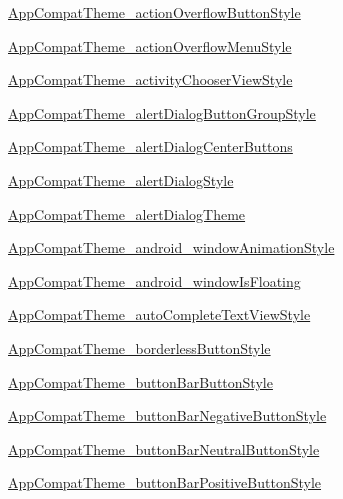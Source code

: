 \begin{Desc}
\hyperlink{classandroid_1_1support_1_1v4_1_1_r_1_1styleable_37abdbb58ba6784cee7b4db7074bb2d4}{AppCompatTheme\_\-actionOverflowButtonStyle} 

\hyperlink{classandroid_1_1support_1_1v4_1_1_r_1_1styleable_a866c80182ecc37a2b36bd4b28132297}{AppCompatTheme\_\-actionOverflowMenuStyle} 

\hyperlink{classandroid_1_1support_1_1v4_1_1_r_1_1styleable_69fd4d038df58587b69f6986d49ed8c1}{AppCompatTheme\_\-activityChooserViewStyle} 

\hyperlink{classandroid_1_1support_1_1v4_1_1_r_1_1styleable_00941c54362f2db3092824ceb3be22dd}{AppCompatTheme\_\-alertDialogButtonGroupStyle} 

\hyperlink{classandroid_1_1support_1_1v4_1_1_r_1_1styleable_8ec720cdfc46d6cc33d23d0459197671}{AppCompatTheme\_\-alertDialogCenterButtons} 

\hyperlink{classandroid_1_1support_1_1v4_1_1_r_1_1styleable_41bab9fb72c63ddb10915533169e3216}{AppCompatTheme\_\-alertDialogStyle} 

\hyperlink{classandroid_1_1support_1_1v4_1_1_r_1_1styleable_58e5759eace5641f42a4605d7670b7da}{AppCompatTheme\_\-alertDialogTheme} 

\hyperlink{classandroid_1_1support_1_1v4_1_1_r_1_1styleable_1d77731fad30decfb99a3a8e55c35700}{AppCompatTheme\_\-android\_\-windowAnimationStyle} 

\hyperlink{classandroid_1_1support_1_1v4_1_1_r_1_1styleable_9692aa9adae84384d1c4a70481a486a6}{AppCompatTheme\_\-android\_\-windowIsFloating} 

\hyperlink{classandroid_1_1support_1_1v4_1_1_r_1_1styleable_8915799c22e82c51ca50dd1d9ff5b50c}{AppCompatTheme\_\-autoCompleteTextViewStyle} 

\hyperlink{classandroid_1_1support_1_1v4_1_1_r_1_1styleable_53709ea62e0ea08225a291fefc09a1b5}{AppCompatTheme\_\-borderlessButtonStyle} 

\hyperlink{classandroid_1_1support_1_1v4_1_1_r_1_1styleable_5392994a38004dcbc49775cdd089d6e9}{AppCompatTheme\_\-buttonBarButtonStyle} 

\hyperlink{classandroid_1_1support_1_1v4_1_1_r_1_1styleable_4a4d3c9d83cb64f07235f8be079992a4}{AppCompatTheme\_\-buttonBarNegativeButtonStyle} 

\hyperlink{classandroid_1_1support_1_1v4_1_1_r_1_1styleable_2e6df35632dfd48914323050d05c0a30}{AppCompatTheme\_\-buttonBarNeutralButtonStyle} 

\hyperlink{classandroid_1_1support_1_1v4_1_1_r_1_1styleable_794f00fd624776c9f0e4eac6e0dd1165}{AppCompatTheme\_\-buttonBarPositiveButtonStyle} 


\end{Desc}
